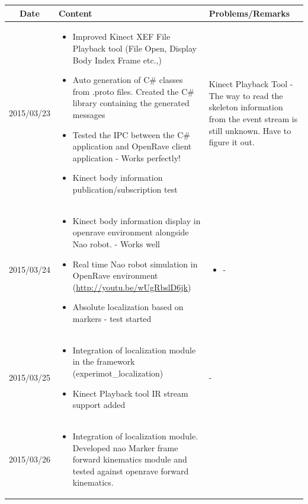 \documentclass[11pt]{article} %
\begin{document}
\begin{center}
    \begin{longtable}{ | c | p{6cm} | p{5cm} |}
    \hline
    Date & Content & Problems/Remarks \\ 
    \endhead
    \hline    
     2015/03/23         & 
  \begin{itemize}
  \item Improved Kinect XEF File Playback tool (File Open, Display Body Index Frame etc.,)
  \item Auto generation of C\# classes from .proto files. Created the C\# library containing the generated messages
  \item Tested the IPC between the C\# application and OpenRave client application - Works perfectly!
  \item Kinect body information publication/subscription test
\end{itemize}  
   & Kinect Playback Tool - The way to read the skeleton information from the event stream is still unknown. Have to figure it out. \\
\hline
  										 
 2015/03/24         & 
  \begin{itemize}
  \item Kinect body information display in openrave environment alongside Nao robot. - Works well 
  \item Real time Nao robot simulation in OpenRave environment (\url{http://youtu.be/wUgRbslD6jk})
  \item Absolute localization based on markers - test started
\end{itemize}   
& 
  \begin{itemize}
  \item -
\end{itemize}  \\
\hline
  										 
  
  2015/03/25        & 
  \begin{itemize}
  \item Integration of localization module in the framework (experimot\_localization)
  \item Kinect Playback tool IR stream support added
\end{itemize}   
  										 & - \\
  \hline
  
  2015/03/26         & 
  \begin{itemize}
  \item Integration of localization module. Developed nao Marker frame forward kinematics module and tested against openrave forward kinematics.
\end{itemize}   
  & 
\\  										 \hline


\end{longtable}
\end{center}
\end{document}
